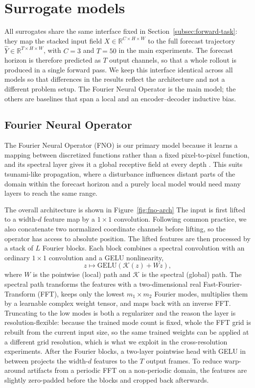 \section{Surrogate models}
\label{sec:models}

All surrogates share the same interface fixed in Section~\ref{subsec:forward-task}: they map the stacked input field $X\in\mathbb{R}^{C \times H \times W}$ to the full forecast trajectory $\widehat{Y}\in\mathbb{R}^{T \times H \times W}$, with $C=3$ and $T=50$ in the main experiments. The forecast horizon is therefore predicted as $T$ output channels, so that a whole rollout is produced in a single forward pass. We keep this interface identical across all models so that differences in the results reflect the architecture and not a different problem setup. The Fourier Neural Operator is the main model; the others are baselines that span a local and an encoder--decoder inductive bias.

\subsection{Fourier Neural Operator}
\label{subsec:fno}

The Fourier Neural Operator (FNO) is our primary model because it learns a mapping between discretized functions rather than a fixed pixel-to-pixel function, and its spectral layer gives it a global receptive field at every depth \citep{li2021fno}. This suits tsunami-like propagation, where a disturbance influences distant parts of the domain within the forecast horizon and a purely local model would need many layers to reach the same range.

The overall architecture is shown in Figure~\ref{fig:fno-arch} The input is first lifted to a width-$d$ feature map by a $1 \times 1$ convolution. Following common practice, we also concatenate two normalized coordinate channels before lifting, so the operator has access to absolute position. The lifted features are then processed by a stack of $L$ Fourier blocks. Each block combines a spectral convolution with an ordinary $1 \times 1$ convolution and a GELU nonlinearity,
\[
z \mapsto \mathrm{GELU} \!\left(\mathcal{K}(z) + W z \right),
\]
where $W$ is the pointwise (local) path and $\mathcal{K}$ is the spectral (global) path. The spectral path transforms the features with a two-dimensional real Fast-Fourier-Transform (FFT), keeps only the lowest $m_1 \times m_2$ Fourier modes, multiplies them by a learnable complex weight tensor, and maps back with an inverse FFT. Truncating to the low modes is both a regularizer and the reason the layer is resolution-flexible: because the trained mode count is fixed, whole the FFT grid is rebuilt from the current input size, so the same trained weights can be applied at a different grid resolution, which is what we exploit in the cross-resolution experiments. After the Fourier blocks, a two-layer pointwise head with GELU in between projects the width-$d$ features to the $T$ output frames. To reduce warp-around artifacts from a periodic FFT on a non-periodic domain, the features are slightly zero-padded before the blocks and cropped back afterwards.

